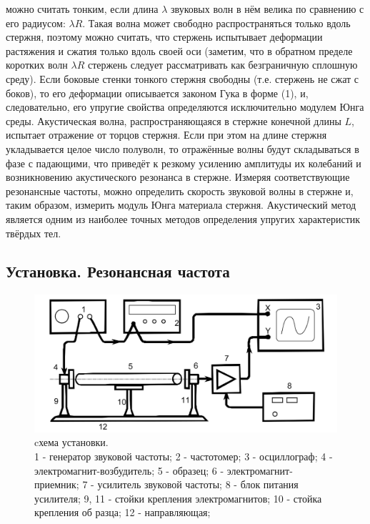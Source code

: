 \documentclass[a4paper, 10pt, twocolumn]{article}
\begin{document}
можно считать тонким, если длина $\lambda$ звуковых волн в нём велика по сравнению
 с его радиусом: $\lambda R$. Такая волна может свободно распространяться только вдоль стержня, поэтому можно считать, что стержень испытывает
 деформации растяжения и сжатия только вдоль своей оси (заметим,
что в обратном пределе коротких волн $\lambda R$ стержень следует рассматривать как безграничную сплошную среду). Если боковые стенки тонкого
стержня свободны (т.е. стержень не сжат с боков), то его деформации описывается законом Гука в форме (1), и, следовательно, его упругие свойства
определяются исключительно модулем Юнга среды.
Акустическая волна, распространяющаяся в стержне конечной длины $L$,
испытает отражение от торцов стержня. Если при этом на длине стержня
укладывается целое число полуволн, то отражённые волны будут складываться в фазе с падающими, что приведёт к резкому усилению амплитуды
их колебаний и возникновению акустического резонанса в стержне. Измеряя соответствующие резонансные частоты, можно определить скорость
звуковой волны в стержне и, таким образом, измерить модуль Юнга материала стержня. Акустический метод является одним из наиболее точных
методов определения упругих характеристик твёрдых тел.
\subsection{Установка. Резонансная частота}
\begin{figure}[h]
    \includegraphics[width=1\linewidth]{installation.png}
    \begin{center}
        \caption{cхема установки. \\ 1 - генератор звуковой частоты; 2 - частотомер; 3 - осциллограф; 4 - 
    электромагнит-возбудитель; 5 - образец; 6 - электромагнит-приемник; 7 - усилитель звуковой частоты;
     8 - блок питания усилителя; 9, 11 - стойки крепления электромагнитов; 10 - стойка крепления об
     разца; 12 - направляющая;}
    \end{center}
\end{figure} 
\end{document}
